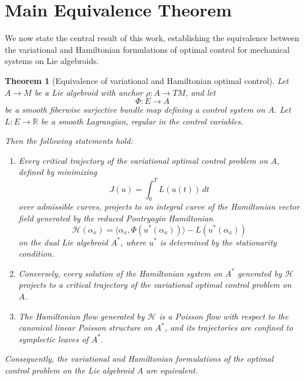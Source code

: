 \documentclass{article}
\newtheorem{theorem}{Theorem}
\begin{document}
\section{Main Equivalence Theorem}

We now state the central result of this work, establishing the equivalence between the variational and Hamiltonian formulations of optimal control for mechanical systems on Lie algebroids.

\begin{theorem}[Equivalence of variational and Hamiltonian optimal control]
Let $A \to M$ be a Lie algebroid with anchor $\rho : A \to TM$, and let
\[
\Phi : E \to A
\]
be a smooth fiberwise surjective bundle map defining a control system on $A$.  
Let $L : E \to \mathbb{R}$ be a smooth Lagrangian, regular in the control variables.

Then the following statements hold:

\begin{enumerate}
\item[(i)] Every critical trajectory of the variational optimal control problem on $A$, defined by minimizing
\[
J(u) = \int_0^T L(u(t))\,dt
\]
over admissible curves, projects to an integral curve of the Hamiltonian vector field generated by the reduced Pontryagin Hamiltonian
\[
\mathcal{H}(\alpha_x) = \langle \alpha_x, \Phi(u^*(\alpha_x)) \rangle - L(u^*(\alpha_x))
\]
on the dual Lie algebroid $A^*$, where $u^*$ is determined by the stationarity condition.

\item[(ii)] Conversely, every solution of the Hamiltonian system on $A^*$ generated by $\mathcal{H}$ projects to a critical trajectory of the variational optimal control problem on $A$.

\item[(iii)] The Hamiltonian flow generated by $\mathcal{H}$ is a Poisson flow with respect to the canonical linear Poisson structure on $A^*$, and its trajectories are confined to symplectic leaves of $A^*$.

\end{enumerate}

Consequently, the variational and Hamiltonian formulations of the optimal control problem on the Lie algebroid $A$ are equivalent.
\end{theorem}
\end{document}
